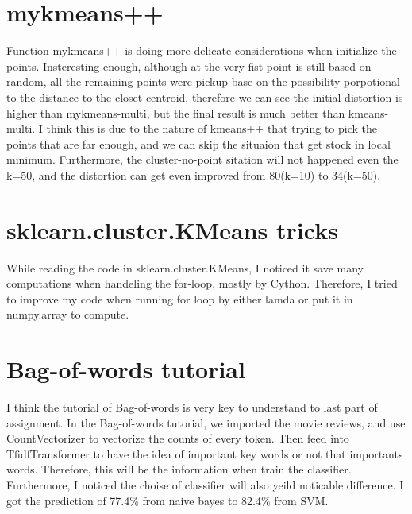 \documentclass[final]{siamltexmm}
\begin{document}
\section{mykmeans++}
Function mykmeans++ is doing more delicate considerations when initialize the points. Insteresting enough, although at the very fist point is still based on random, all the remaining points were pickup base on the possibility porpotional to the distance to the closet centroid, therefore we can see the initial distortion is higher than mykmeans-multi, but the final result is much better than kmeans-multi. I think this is due to the nature of kmeans++ that trying to pick the points that are far enough, and we can skip the situaion that get stock in local minimum. Furthermore, the cluster-no-point sitation will not happened even the k=50, and the distortion can get even improved from 80(k=10) to 34(k=50).

\section{sklearn.cluster.KMeans tricks}
While reading the code in sklearn.cluster.KMeans, I noticed it save many computations when handeling the for-loop, mostly by Cython. Therefore, I tried to improve my code when running for loop by either lamda or put it in numpy.array to compute.

\section{Bag-of-words tutorial}
I think the tutorial of Bag-of-words is very key to understand to last part of assignment. In the Bag-of-words tutorial, we imported the movie reviews, and use CountVectorizer to vectorize the counts of every token. Then feed into TfidfTransformer to have the idea of important key words or not that importants words. Therefore, this will be the information when train the classifier. Furthermore, I noticed the choise of classifier will also yeild noticable difference. I got the prediction of 77.4\% from naive bayes to 82.4\% from SVM.
\end{document}
